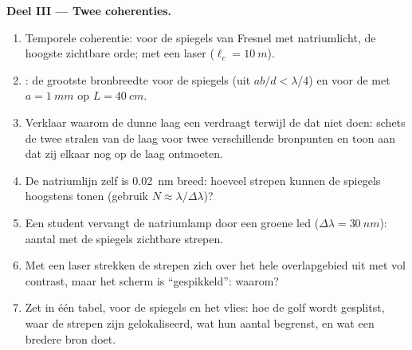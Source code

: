 \begin{problem}
\medskip
\noindent\textbf{Deel III --- Twee coherenties.}
\begin{enumerate}[resume]
  \item Temporele coherentie: voor de spiegels van Fresnel met natriumlicht,
        de hoogste zichtbare orde; met een laser ($\ell_c = \qty{10}{m}$).
  \item {}: de grootste bronbreedte voor de spiegels
        (uit $ab/d < \lambda/4$) en voor de  met
        $a = \qty{1}{mm}$ op
        $L = \qty{40}{cm}$.
  \item Verklaar waarom de dunne laag een  verdraagt terwijl
        de  dat niet doen: schets de twee stralen van de
        laag voor twee
        verschillende bronpunten en toon aan dat zij elkaar nog op de laag
        ontmoeten.
  \item De natriumlijn zelf is \qty{0.02}{nm} breed: hoeveel strepen
        kunnen de spiegels hoogstens tonen (gebruik
        $N \approx \lambda/\Delta\lambda$)?
  \item Een student vervangt de natriumlamp door een groene led
        ($\Delta\lambda =
        \qty{30}{nm}$): aantal met de spiegels
        zichtbare strepen.
  \item Met een laser strekken de strepen zich over het hele overlapgebied
        uit met vol contrast, maar het scherm is ``gespikkeld'': waarom?
  \item Zet in één tabel, voor de spiegels en het vlies: hoe de golf wordt
        gesplitst, waar de strepen zijn gelokaliseerd, wat hun aantal begrenst,
        en wat een bredere bron doet.
\end{enumerate}
\end{problem}
